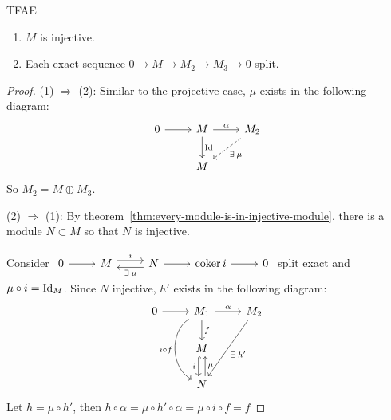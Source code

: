 \begin{prop}
  TFAE
  \begin{enumerate}
    \item $M$ is injective.
    \item Each exact sequence $0 \to M \to M_2 \to M_3 \to 0$ split.
  \end{enumerate}
  \begin{proof}
    (1) $\Rightarrow$ (2): Similar to the projective case, $\mu$ exists
    in the following diagram:
    \[
    \begin{tikzcd}
      0 \ar[r] & M \ar[r, "\alpha"] \ar[d, "\Id"] & M_2 \ar[dl, "\exists
      \mu", dashed] \\
               & M
    \end{tikzcd}
    \]
    So $M_2 = M \oplus M_3$.

    (2) $\Rightarrow$ (1):
    By theorem~\ref{thm:every-module-is-in-injective-module},
    there is a module $N \subset M$ so that $N$ is injective.

    Consider
    $
    \begin{tikzcd}
    0 \ar[r] & M \ar[r, "i", yshift=0.7ex] &  N \ar[r] \ar[l, "\exists \mu", 
      yshift=-0.7ex] & \coker i \ar[r]& 0
    \end{tikzcd}
    $
    split exact and $\mu \circ i = {\rm Id}_M$. Since $N$ injective,
    $h'$ exists in the following diagram:
    $$
    \begin{tikzcd}
      0 \ar[r] & M_1 \ar[r, "\alpha"] \ar[d , "f"] \ar[dd, "i 
      \circ f" swap, bend right = 60] & M_2 \ar[ddl, "\exists h'"]\\
               & M \ar[d, xshift=-0.7ex, "i" swap , hook] \\
               & N \ar[u, xshift=0.7ex, "\mu" swap]
    \end{tikzcd}
    $$
    Let $h = \mu \circ h'$, then $h \circ \alpha = \mu \circ h' 
    \circ \alpha = \mu \circ i \circ f = f$
  \end{proof}
\end{prop}

